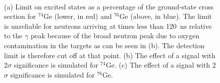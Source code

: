 \begin{figure}[!htbp]
\centering
{} \\
\hspace{8pt}
\caption{(a) Limit on excited \zp states as a percentage of the ground-state cross section for $^{74}$Ge (lower, in red) and $^{76}$Ge (above, in blue).  The limit is unreliable for neutrons arriving at times less than 120~ns relative to the $\gamma$ peak because of the broad neutron peak due to oxygen contamination in the targets as can be seen in (b).  The detection limit is therefore cut off at that point.  (b) The effect of a signal with 2$\sigma$ significance is simulated for $^{74}$Ge.  (c) The effect of a signal with 2$\sigma$ significance is simulated for  $^{76}$Ge.}
\label{fig:differentLimits}
\end{figure}

